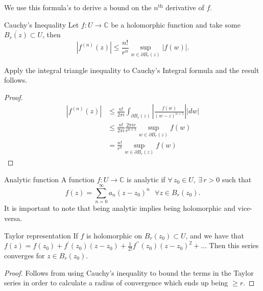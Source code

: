 \documentclass{article}
\begin{document}
We use this formula's to derive a bound on the \( n^{\text{th} }  \) derivative of \( f \). 

\begin{thrm}{Cauchy's Inequality}{}
Let \( f: U \to \mathbb{C} \) be a holomorphic function and take some \( \overline{B_r(z)} \subset U  \), then
\[
    \left\lvert f^{(n)}(z) \right\rvert \leq \frac{n!}{r^n}\sup _{w\in \partial B_r (z)} \left\lvert f(w) \right\rvert .
\]
\tcbline

Apply the integral triangle inequality to Cauchy's Integral formula and the result follows.
\begin{proof}

    \begin{align*}
        \left\lvert f^{(n)}(z) \right\rvert &\leq \frac{n!}{2\pi i} \int_{\partial B_r(z)} \left\lvert \frac{f(w)}{(w - z)^{n+ 1} }  \right\rvert \left\lvert dw \right\rvert \\
        &\leq \frac{n!}{2\pi i}\frac{2\pi i r}{r^{n+ 1} }  \sup _{w \in \partial B_r(z)} f(w)\\
        &= \frac{n!}{r^n} \sup _{w \in \partial B_r(z)} f(w)
    \end{align*}
    
\end{proof}

\end{thrm}

\begin{defn}{Analytic function}{}
A function \( f: U \to \mathbb{C}  \) is analytic if \( \forall \, z_0 \in U,  \ \exists \, r>0 \) such that 
\[
    f(z) = \sum_{n= 0}^{\infty} a_{n} (z - z_0)^n  \ \ \  \forall z\in B_r(z_0).
\]
It is important to note that being analytic implies being holomorphic and vice-versa. 
\end{defn}

\begin{thrm}{Taylor representation}{}
If \( f \) is holomorphic on \( B_r(z_0) \subset U \), and we have that  
\( f(z) = f(z _0) + f^\prime (z_0)(z - z_0)+ \frac{1}{2!}f^{\prime\prime} (z_0)(z - z_0)^{2} + \dots  \) Then this series converges for \( z \in B_r(z_0) \). 

\tcbline

\begin{proof}
Follows from using Cauchy's inequality to bound the terms in the Taylor series in order to calculate a radius of convergence which ends up being \( \geq r \). 
\end{proof}

\end{thrm}
\end{document}
